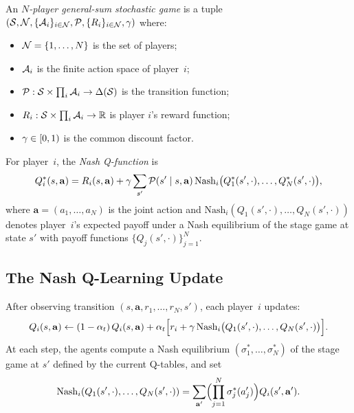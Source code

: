 \documentclass[11pt,a4paper]{article}
\begin{document}
\begin{definition}
\label{def:general-sum-sg}
An \emph{$N$-player general-sum stochastic game} is a tuple
$(\mathcal{S}, \mathcal{N}, \{\mathcal{A}_i\}_{i \in \mathcal{N}},
\mathcal{P}, \{R_i\}_{i \in \mathcal{N}}, \gamma)$ where:
\begin{itemize}
  \item $\mathcal{N} = \{1, \ldots, N\}$ is the set of players;
  \item $\mathcal{A}_i$ is the finite action space of player~$i$;
  \item $\mathcal{P} : \mathcal{S} \times \prod_{i} \mathcal{A}_i \to
    \Delta(\mathcal{S})$ is the transition function;
  \item $R_i : \mathcal{S} \times \prod_{i} \mathcal{A}_i \to \mathbb{R}$ is player
    $i$'s reward function;
  \item $\gamma \in [0,1)$ is the common discount factor.
\end{itemize}
\end{definition}

\begin{definition}
\label{def:nash-q}
For player~$i$, the \emph{Nash Q-function} is
\[
  Q_i^*(s, \mathbf{a})
  = R_i(s, \mathbf{a})
  + \gamma \sum_{s'} \mathcal{P}(s' \mid s, \mathbf{a})\,
    \mathrm{Nash}_i\bigl(Q_1^*(s', \cdot), \ldots, Q_N^*(s', \cdot)\bigr),
\]
where $\mathbf{a} = (a_1, \ldots, a_N)$ is the joint action and
$\mathrm{Nash}_i(Q_1(s',\cdot), \ldots, Q_N(s',\cdot))$ denotes
player~$i$'s expected payoff under a Nash equilibrium of the stage game
at state $s'$ with payoff functions $\{Q_j(s', \cdot)\}_{j=1}^N$.
\end{definition}

\subsection{The Nash Q-Learning Update}

\begin{definition}
\label{def:nashq-update}
After observing transition $(s, \mathbf{a}, r_1, \ldots, r_N, s')$,
each player~$i$ updates:
\begin{equation}
\label{eq:nashq-update}
  Q_i(s, \mathbf{a})
  \leftarrow (1 - \alpha_t)\, Q_i(s, \mathbf{a})
  + \alpha_t \Bigl[ r_i + \gamma\,
    \mathrm{Nash}_i\bigl(Q_1(s', \cdot), \ldots, Q_N(s', \cdot)\bigr)
    \Bigr].
\end{equation}
At each step, the agents compute a Nash equilibrium
$(\sigma_1^*, \ldots, \sigma_N^*)$ of the stage game at $s'$ defined by
the current Q-tables, and set
\[
  \mathrm{Nash}_i(Q_1(s',\cdot), \ldots, Q_N(s',\cdot))
  = \sum_{\mathbf{a}'} \Bigl(\prod_{j=1}^N \sigma_j^*(a_j')\Bigr)
    Q_i(s', \mathbf{a}').
\]
\end{definition}
\end{document}
